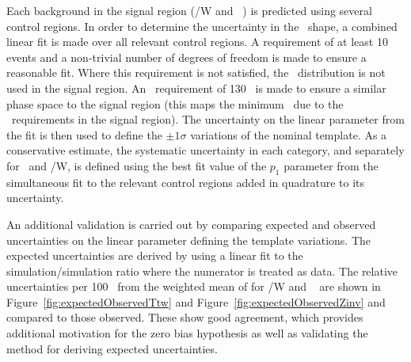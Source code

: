 Each background in the signal region (\ttbar/W  and \zInv~) is predicted 
using several control regions. In order to determine the uncertainty in
the \mht~shape, a combined linear fit is made over all relevant control regions. 
A requirement of at least 10 events and a non-trivial
number of degrees of freedom is made to ensure a reasonable fit. Where this
requirement is not satisfied, the \mht~distribution is not used in the signal region.
An \mht~requirement of 130 \GeV~is made to ensure a similar phase space to 
the signal region (this maps the minimum \mht~due to the \alphat~requirements in the signal region).
The uncertainty on the linear parameter from the fit is then
used to define the $\pm 1 \sigma$ variations of the nominal template.
As a conservative estimate, the systematic uncertainty in each category, and separately
for \zInv~and \ttbar/W, is defined using the best fit value of the $p_1$ parameter 
from the simultaneous fit to the relevant control regions
added in quadrature to its uncertainty.


An additional validation is carried out by comparing expected and observed uncertainties
on the linear parameter defining the template variations.
The expected uncertainties are derived by using a linear fit to the simulation/simulation ratio where the numerator
is treated as data. The relative uncertainties per 100 \GeV~from the weighted mean of \mht
for \ttbar/W and \zInv~ are shown in Figure~\ref{fig:expectedObservedTtw} 
and Figure~\ref{fig:expectedObservedZinv} and compared to those observed.
These show good agreement, which provides additional motivation for the 
zero bias hypothesis as well as validating the method for deriving expected uncertainties.


